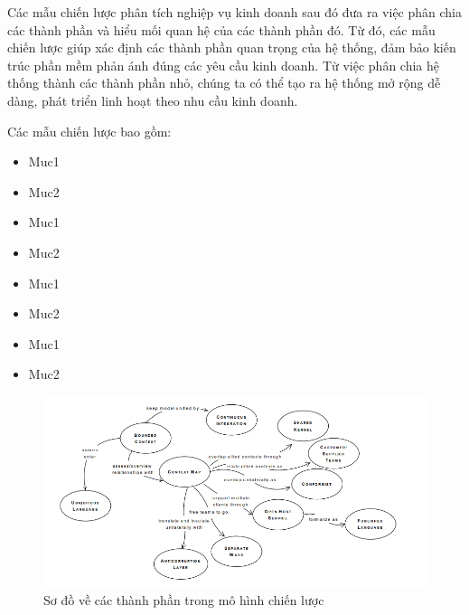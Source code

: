 Các mẫu chiến lược phân tích nghiệp vụ kinh doanh sau đó đưa ra việc phân chia các thành phần và hiểu mối quan hệ của các thành phần đó. Từ đó, các mẫu chiến lược giúp xác định các thành phần quan trọng của hệ thống, đảm bảo kiến trúc phần mềm phản ánh đúng các yêu cầu kinh doanh. Từ việc phân chia hệ thống thành các thành phần nhỏ, chúng ta có thể tạo ra hệ thống mở rộng dễ dàng, phát triển linh hoạt theo nhu cầu kinh doanh.

Các mẫu chiến lược bao gồm:

\begin{itemize}







\item Muc1

\item Muc2

\item Muc1

\item Muc2

\item Muc1

\item Muc2

\item Muc1

\item Muc2

\end{itemize}






\begin{figure}[H]

\centering

\includegraphics[scale = 0.9]{pictures/cac_mau_chien_luoc/temp.png}

\caption{Sơ đồ về các thành phần trong mô hình chiến lược}

\end{figure}

